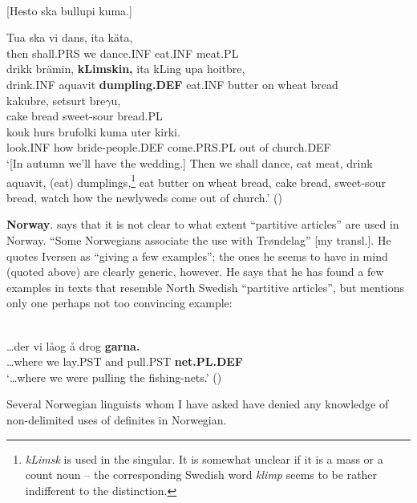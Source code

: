 \ea\label{}
\\
{}[Hesto ska bullupi kuma.] 

\gll 	Tua  ska  vi  dans,  ita  käta,\\
		then   shall.PRS  we  dance.INF  eat.INF  meat.PL\\
\gll 	drikk  brämin,  \textbf{kLimskin,} ita  kLing  upa  hoitbre,\\
		drink.INF  aquavit  \textbf{dumpling.DEF  } eat.INF  butter  on  wheat bread\\
\gll 	kakubre,  setsurt  bre$\gamma $u,\\
		cake bread  sweet-sour  bread.PL\\
\gll 	kouk  hurs  brufolki  kuma  uter  kirki.\\
		look.INF  how  bride-people.DEF  come.PRS.PL  out of   church.DEF\\
\glt 	‘[In autumn we’ll have the wedding.] Then we shall dance, eat meat, drink aquavit, (eat) dumplings,\footnote{ \textit{k}\textit{L}\textit{imsk} is used in the singular. It is somewhat unclear if it is a mass or a count noun – the corresponding Swedish word \textit{klimp} seems to be rather indifferent to the distinction.  } eat butter on wheat bread, cake bread, sweet-sour bread, watch how the newlyweds come out of church.’ (\citet[76]{Vendell1882})

\z

\textbf{Norway}. \citet[16]{Delsing2003a} says that it is not clear to what extent “partitive articles” are used in Norway. “Some Norwegians associate the use with Trøndelag” [my transl.]. He quotes Iversen as “giving a few examples”; the ones he seems to have in mind (quoted above) are clearly generic, however. He says that he has found a few examples in texts that resemble North Swedish “partitive articles”, but mentions only one perhaps not too convincing example: 

\ea \label{} 
\\
\gll …der  vi  låog  å  drog  \textbf{garna.}\textit{  }\\
…where  we  lay.PST   and  pull.PST  \textbf{net.PL.DEF} \\
\glt ‘…where we were pulling the fishing-nets.’ (\citet[16]{Delsing2003a})

\z

Several Norwegian linguists whom I have asked have denied any knowledge of non-delimited uses of definites in Norwegian. 

